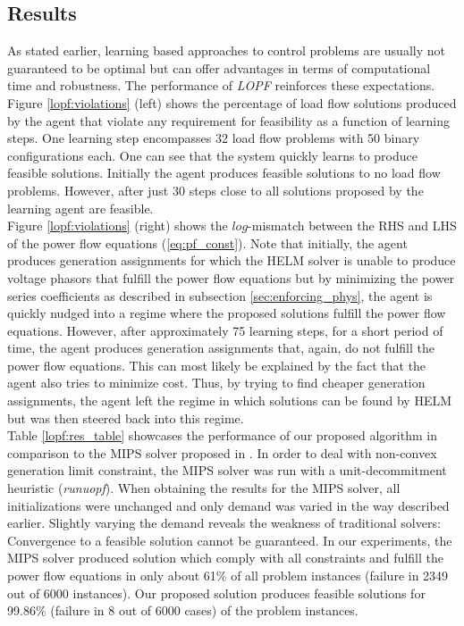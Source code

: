 \subsection{Results}
\label{sec:LOPFresults}
As stated earlier, learning based approaches to control problems are usually not guaranteed to be optimal but can offer advantages in terms of computational time and robustness. The performance of \emph{LOPF} reinforces these expectations. Figure \ref{lopf:violations} (left) shows the percentage of load flow solutions produced by the agent that violate any requirement for feasibility as a function of learning steps. One learning step encompasses 32 load flow problems with 50 binary configurations each. One can see that the system quickly learns to produce feasible solutions. Initially the agent produces feasible solutions to no load flow problems. However, after just 30 steps close to all solutions proposed by the learning agent are feasible.\\
Figure \ref{lopf:violations} (right) shows the $log$-mismatch between the RHS and LHS of the power flow equations (\ref{eq:pf_const}). Note that initially, the agent produces generation assignments for which the HELM solver is unable to produce voltage phasors that fulfill the power flow equations but by minimizing the power series coefficients as described in subsection \ref{sec:enforcing_phys}, the agent is quickly nudged into a regime where the proposed solutions fulfill the power flow equations. However, after approximately 75 learning steps, for a short period of time, the agent produces generation assignments that, again, do not fulfill the power flow equations. This can most likely be explained by the fact that the agent also tries to minimize cost. Thus, by trying to find cheaper generation assignments, the agent left the regime in which solutions can be found by HELM but was then steered back into this regime.\\
Table \ref{lopf:res_table} showcases the performance of our proposed algorithm in comparison to the MIPS solver proposed in \cite{zimmerman2011matpower}. In order to deal with non-convex generation limit constraint, the MIPS solver was run with a unit-decommitment heuristic (\emph{runuopf}). When obtaining the results for the MIPS solver, all initializations were unchanged and only demand was varied in the way described earlier. Slightly varying the demand reveals the weakness of traditional solvers: Convergence to a feasible solution cannot be guaranteed. In our experiments, the MIPS solver produced solution which comply with all constraints and fulfill the power flow equations in only about 61\% of all problem instances (failure in 2349 out of 6000 instances). Our proposed solution produces feasible solutions for 99.86\% (failure in 8 out of 6000 cases) of the problem instances.\\
